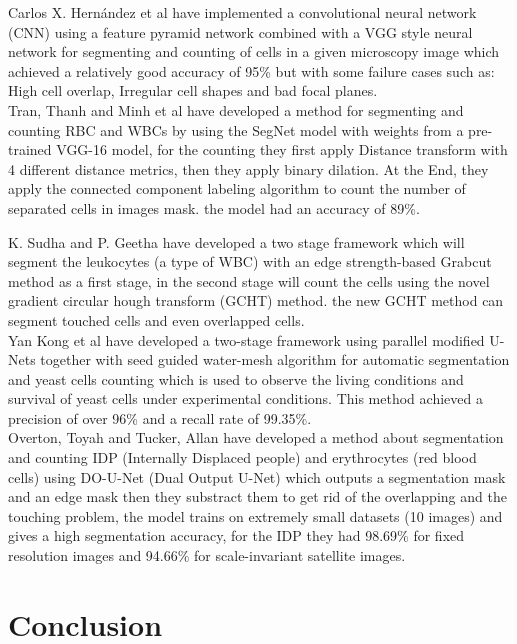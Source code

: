Carlos X. Hern{\'{a}}ndez et al \textsuperscript{\cite{DBLP:journals/corr/abs-1802-10548}} have implemented a convolutional neural network (CNN) using a feature pyramid network combined with a VGG style neural network for segmenting and counting of cells in a given microscopy image which achieved a relatively good accuracy of 95\% but with some failure cases such as: High cell overlap, Irregular cell shapes and bad focal planes.\\

Tran, Thanh and Minh et al \textsuperscript{\cite{DBLP:journals/corr/abs-1802-10548}} have developed a method for segmenting and counting RBC and WBCs by using the SegNet model with weights from a pre-trained VGG-16 model, for the counting they first apply Distance transform with 4 different distance metrics, then they apply binary dilation. At the End, they apply the connected component labeling algorithm to count the number of separated cells in images mask. the model had an accuracy of 89\%.

\newpage

K. Sudha and P. Geetha \textsuperscript{\cite{SUDHA2020639}} have developed a two stage framework which will segment the leukocytes (a type of WBC) with an edge strength-based Grabcut method as a first stage, in the second stage will count the cells using the novel gradient circular hough transform (GCHT) method. the new GCHT method can segment touched cells and even overlapped cells.\\

Yan Kong et al \textsuperscript{\cite{Kong:20}} have developed a two-stage framework using parallel modified U-Nets together with seed guided water-mesh algorithm for automatic segmentation and yeast cells counting which is used to observe the living conditions and survival of yeast cells under experimental conditions. This method achieved a precision of over 96\% and a recall rate of 99.35\%.\\

Overton, Toyah and Tucker, Allan \textsuperscript{\cite{10.1007/978-3-030-44584-3_31}} have developed a method about segmentation and counting IDP (Internally Displaced people) and erythrocytes (red blood cells) using DO-U-Net (Dual Output U-Net) which outputs a segmentation mask and an edge mask then they substract them to get rid of the overlapping and the touching problem, the model trains on extremely small datasets (10 images) and gives a high segmentation accuracy, for the IDP they had 98.69\% for fixed resolution images and 94.66\% for scale-invariant satellite images.\\

\section{Conclusion}
\vspace{0.1in}
\hspace*{0.16in}
